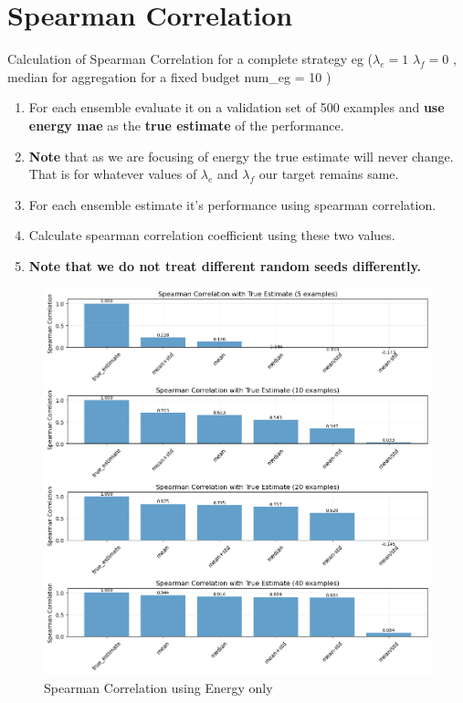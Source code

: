 \documentclass[12pt]{article}
\theoremstyle{definition}
\theoremstyle{remark}
\begin{document}
\section{Spearman Correlation}
Calculation of Spearman Correlation for a complete strategy eg ($\lambda_e=1$ $\lambda_f=0$ , median for aggregation for a fixed budget num\_eg = 10 )
\begin{enumerate}
    \item For each ensemble evaluate it on a validation set of 500 examples and \textbf{use energy mae} as the \textbf{true estimate} of the performance.
    \item \textbf{Note} that as we are focusing of energy the true estimate will never change. That is for whatever values of $\lambda_e$ and $\lambda_f$ our target remains same.
    \item For each ensemble estimate it's performance using spearman correlation.
    \item Calculate spearman correlation coefficient using these two values.
    \item \textbf{Note that we do not treat different random seeds differently.}
\end{enumerate}
\begin{figure}[htbp]
    \centering
    \includegraphics[width=0.75\linewidth]{plots/spearman coorelation using energy.png}
    \caption{Spearman Correlation using Energy only }
    \label{fig:placeholder}
\end{figure}
\newpage
\end{document}
